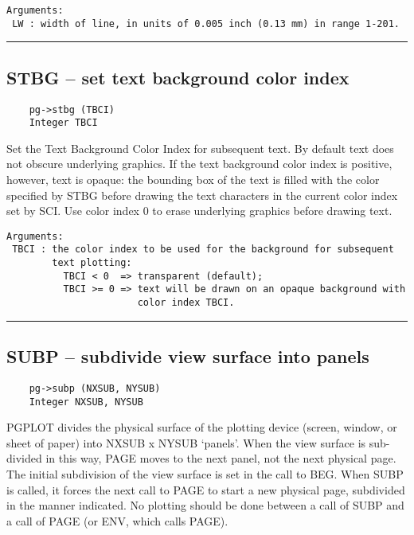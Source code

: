 \begin{verbatim}
Arguments:
 LW : width of line, in units of 0.005 inch (0.13 mm) in range 1-201. 
\end{verbatim}

\hrule

\subsection*{STBG -- set text background color index }

\begin{verbatim}
    pg->stbg (TBCI)
    Integer TBCI
\end{verbatim}

Set the Text Background Color Index for subsequent text.  By default
text does not obscure underlying graphics.  If the text background
color index is positive, however, text is opaque: the bounding box of
the text is filled with the color specified by STBG before drawing the
text characters in the current color index set by SCI.  Use color
index 0 to erase underlying graphics before drawing text.

\begin{verbatim}
Arguments:
 TBCI : the color index to be used for the background for subsequent
        text plotting: 
          TBCI < 0  => transparent (default);
          TBCI >= 0 => text will be drawn on an opaque background with
                       color index TBCI. 
\end{verbatim}

\hrule

\subsection*{SUBP -- subdivide view surface into panels }

\begin{verbatim}
    pg->subp (NXSUB, NYSUB)
    Integer NXSUB, NYSUB
\end{verbatim}

PGPLOT divides the physical surface of the plotting device (screen,
window, or sheet of paper) into NXSUB x NYSUB `panels'.  When the view
surface is sub-divided in this way, PAGE moves to the next panel, not
the next physical page.  The initial subdivision of the view surface
is set in the call to BEG.  When SUBP is called, it forces the next
call to PAGE to start a new physical page, subdivided in the manner
indicated.  No plotting should be done between a call of SUBP and a
call of PAGE (or ENV, which calls PAGE).

